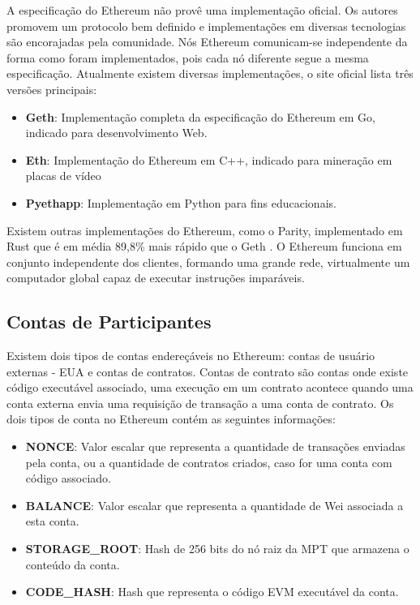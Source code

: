 \documentclass[tcc,capa]{texufpel}
\begin{document}
    A especificação do Ethereum não provê uma implementação oficial. Os autores promovem um protocolo bem definido e implementações em diversas tecnologias são encorajadas pela comunidade. Nós Ethereum comunicam-se independente da forma como foram implementados, pois cada nó diferente segue a mesma especificação. Atualmente existem diversas implementações, o site oficial lista três versões principais:
    
    \begin{itemize}
        \item \textbf{Geth}: Implementação completa da especificação do Ethereum em Go, indicado para desenvolvimento Web.
        \item \textbf{Eth}: Implementação do Ethereum em C++, indicado para mineração em placas de vídeo
        \item \textbf{Pyethapp}: Implementação em Python para fins educacionais.
    \end{itemize}
    
    Existem outras implementações do Ethereum, como o Parity, implementado em Rust que é em média 89,8\% mais rápido que o Geth \cite{rouhaniperformance}. O Ethereum funciona em conjunto independente dos clientes, formando uma grande rede, virtualmente um computador global capaz de executar instruções imparáveis.
    
    
	\subsection{Contas de Participantes}\label{ssc:contas-de-participantes}
	
	Existem dois tipos de contas endereçáveis no Ethereum: contas de usuário externas - EUA e contas de contratos. Contas de contrato são contas onde existe código executável associado, uma execução em um contrato acontece quando uma conta externa envia uma requisição de transação a uma conta de contrato. Os dois tipos de conta no Ethereum contém as seguintes informações:
	
	\begin{itemize}
	    \item \textbf{NONCE}: Valor escalar que representa a quantidade de transações enviadas pela conta, ou a quantidade de contratos criados, caso for uma conta com código associado.
	    \item \textbf{BALANCE}: Valor escalar que representa a quantidade de Wei associada a esta conta.
	    \item \textbf{STORAGE\_ROOT}: Hash de 256 bits do nó raiz da MPT que armazena o conteúdo da conta. 
	    \item \textbf{CODE\_HASH}: Hash que representa o código EVM executável da conta.
	\end{itemize}
	
\end{document}
